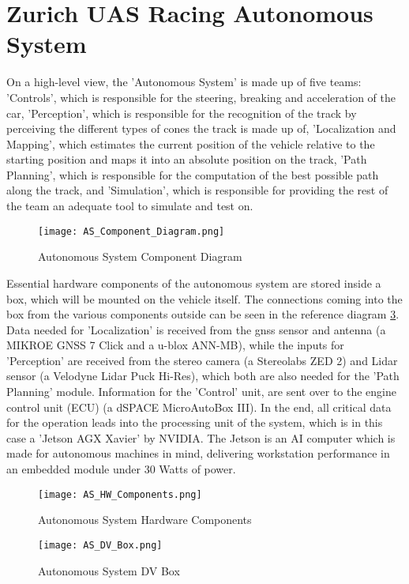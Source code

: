 \section{Zurich UAS Racing Autonomous System}
On a high-level view, the 'Autonomous System' is made up of five teams: 'Controls', which is responsible for the steering, breaking and acceleration of the car, 'Perception', which is responsible for the recognition of the track by perceiving the different types of cones the track is made up of, 'Localization and Mapping', which estimates the current position of the vehicle relative to the starting position and maps it into an absolute position on the track, 'Path Planning', which is responsible for the computation of the best possible path along the track, and 'Simulation', which is responsible for providing the rest of the team an adequate tool to simulate and test on.
\begin{figure}[H]
    \centering
    \texttt{[image: AS\_Component\_Diagram.png]}
    \caption{Autonomous System Component Diagram}
    \label{fig:AS Component Diagram}
\end{figure}

Essential hardware components of the autonomous system are stored inside a box, which will be mounted on the vehicle itself. The connections coming into the box from the various components outside can be seen in the reference diagram \ref{fig:AS DV Box}. Data needed for 'Localization' is received from the \acrshort{gnss} sensor and antenna (a MIKROE GNSS 7 Click and a u-blox ANN-MB), while the inputs for 'Perception' are received from the stereo camera (a Stereolabs ZED 2) and Lidar sensor (a Velodyne Lidar Puck Hi-Res), which both are also needed for the 'Path Planning' module. Information for the 'Control' unit, are sent over to the engine control unit (ECU) (a dSPACE MicroAutoBox III). In the end, all critical data for the operation leads into the processing unit of the system, which is in this case a 'Jetson AGX Xavier' by NVIDIA. The Jetson is an AI computer which is made for autonomous machines in mind, delivering workstation performance in an embedded module under 30 Watts of power.
\begin{figure}[H]
    \centering
    \texttt{[image: AS\_HW\_Components.png]}
    \caption{Autonomous System Hardware Components}
    \label{fig:AS HW Components}
\end{figure}
\begin{figure}[H]
    \centering
    \texttt{[image: AS\_DV\_Box.png]}
    \caption{Autonomous System DV Box}
    \label{fig:AS DV Box}
\end{figure}

